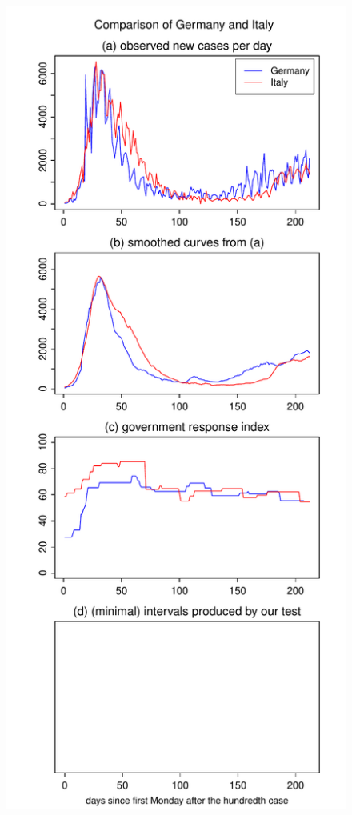 \documentclass[a4paper,12pt]{article}
\numberwithin{equation}{section}
\begin{document}
\begin{figure}[h!]
\begin{minipage}[t]{0.49\textwidth}
\includegraphics[width=\textwidth]{plots/DEU_vs_ITA_long}

\end{minipage}
\end{figure}
\end{document}
